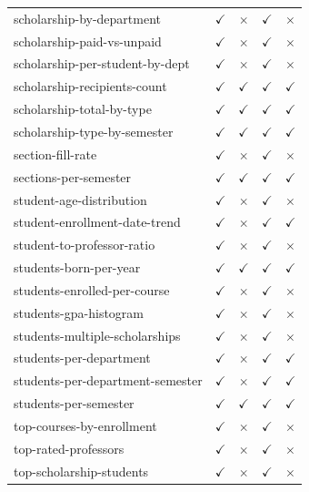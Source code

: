 \begin{longtable}{lcccc}
scholarship-by-department & $\checkmark$ & $\times$ & $\checkmark$ & $\times$ \\
scholarship-paid-vs-unpaid & $\checkmark$ & $\times$ & $\checkmark$ & $\times$ \\
scholarship-per-student-by-dept & $\checkmark$ & $\times$ & $\checkmark$ & $\times$ \\
scholarship-recipients-count & $\checkmark$ & $\checkmark$ & $\checkmark$ & $\checkmark$ \\
scholarship-total-by-type & $\checkmark$ & $\checkmark$ & $\checkmark$ & $\checkmark$ \\
scholarship-type-by-semester & $\checkmark$ & $\checkmark$ & $\checkmark$ & $\checkmark$ \\
section-fill-rate & $\checkmark$ & $\times$ & $\checkmark$ & $\times$ \\
sections-per-semester & $\checkmark$ & $\checkmark$ & $\checkmark$ & $\checkmark$ \\
student-age-distribution & $\checkmark$ & $\times$ & $\checkmark$ & $\times$ \\
student-enrollment-date-trend & $\checkmark$ & $\times$ & $\checkmark$ & $\checkmark$ \\
student-to-professor-ratio & $\checkmark$ & $\times$ & $\checkmark$ & $\times$ \\
students-born-per-year & $\checkmark$ & $\checkmark$ & $\checkmark$ & $\checkmark$ \\
students-enrolled-per-course & $\checkmark$ & $\times$ & $\checkmark$ & $\times$ \\
students-gpa-histogram & $\checkmark$ & $\times$ & $\checkmark$ & $\times$ \\
students-multiple-scholarships & $\checkmark$ & $\times$ & $\checkmark$ & $\times$ \\
students-per-department & $\checkmark$ & $\times$ & $\checkmark$ & $\checkmark$ \\
students-per-department-semester & $\checkmark$ & $\times$ & $\checkmark$ & $\checkmark$ \\
students-per-semester & $\checkmark$ & $\checkmark$ & $\checkmark$ & $\checkmark$ \\
top-courses-by-enrollment & $\checkmark$ & $\times$ & $\checkmark$ & $\times$ \\
top-rated-professors & $\checkmark$ & $\times$ & $\checkmark$ & $\times$ \\
top-scholarship-students & $\checkmark$ & $\times$ & $\checkmark$ & $\times$ \\

\end{longtable}
